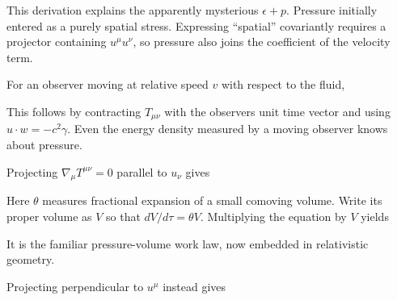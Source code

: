 \documentclass[
  11pt,
  letterpaper,
  oneside,
  openany]{scrbook}
\begin{document}
This derivation explains the apparently mysterious \(\epsilon+p\).
Pressure initially entered as a purely spatial stress. Expressing
``spatial'' covariantly requires a projector containing \(u^\mu u^\nu\),
so pressure also joins the coefficient of the velocity term.

For an observer moving at relative speed \(v\) with respect to the
fluid,

\begin{center}
\begingroup
{}
\ifdim\wd\grmathbox>\linewidth
\resizebox{\linewidth}{!}{\usebox{\grmathbox}}
\else\usebox{\grmathbox}\fi
\endgroup
\end{center}

This follows by contracting \(T_{\mu\nu}\) with the
observer\textquotesingle s unit time vector and using
\(u\cdot w=-c^2\gamma\). Even the energy density measured by a moving
observer knows about pressure.

Projecting \(\nabla_\mu T^{\mu\nu}=0\) parallel to \(u_\nu\) gives

\begin{center}
\begingroup
{}
\ifdim\wd\grmathbox>\linewidth
\resizebox{\linewidth}{!}{\usebox{\grmathbox}}
\else\usebox{\grmathbox}\fi
\endgroup
\end{center}

Here \(\theta\) measures fractional expansion of a small comoving
volume. Write its proper volume as \(V\) so that \(dV/d\tau=\theta V\).
Multiplying the equation by \(V\) yields

\begin{center}
\begingroup
{}
\ifdim\wd\grmathbox>\linewidth
\resizebox{\linewidth}{!}{\usebox{\grmathbox}}
\else\usebox{\grmathbox}\fi
\endgroup
\end{center}

It is the familiar pressure-volume work law, now embedded in
relativistic geometry.

Projecting perpendicular to \(u^\mu\) instead gives

\begin{center}
\begingroup
{}
\ifdim\wd\grmathbox>\linewidth
\resizebox{\linewidth}{!}{\usebox{\grmathbox}}
\else\usebox{\grmathbox}\fi
\endgroup
\end{center}
\end{document}
